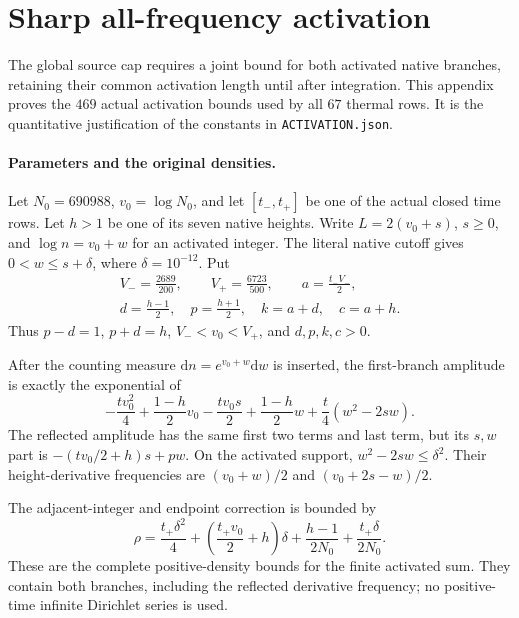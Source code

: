 \documentclass[11pt,a4paper]{article}
\theoremstyle{definition}
\theoremstyle{remark}
\newcommand{\dd}{\mathrm d}
\begin{document}






\clearpage\appendix
\section{Sharp all-frequency activation}\label{verification:sharp-activation}
The global source cap requires a joint bound for both activated native
branches, retaining their common activation length until after integration.
This appendix proves the $469$ actual activation bounds used by all $67$
thermal rows. It is the quantitative justification of the constants in
\texttt{ACTIVATION.json}.

\paragraph{Parameters and the original densities.}
Let $N_0=690988$, $v_0=\log N_0$, and let $[t_-,t_+]$ be one of the
actual closed time rows. Let $h>1$ be one of its seven native heights.
Write $L=2(v_0+s)$, $s\ge0$, and $\log n=v_0+w$ for an activated
integer. The literal native cutoff gives $0<w\le s+\delta$, where
$\delta=10^{-12}$. Put
\begin{gather*}
 V_-=\frac{2689}{200},\qquad V_+=\frac{6723}{500},\qquad
 a=\frac{t_-V_-}{2},\\
 d=\frac{h-1}{2},\quad p=\frac{h+1}{2},\quad k=a+d,\quad c=a+h.
\end{gather*}
Thus $p-d=1$, $p+d=h$, $V_-<v_0<V_+$, and $d,p,k,c>0$.

After the counting measure $\dd n=e^{v_0+w}\dd w$ is inserted, the
first-branch amplitude is exactly the exponential of
\[
 -\frac{t v_0^2}{4}+\frac{1-h}{2}v_0
 -\frac{t v_0s}{2}+\frac{1-h}{2}w
 +\frac t4(w^2-2sw).
\]
The reflected amplitude has the same first two terms and last term,
but its $s,w$ part is $-(t v_0/2+h)s+pw$. On the activated support,
$w^2-2sw\le\delta^2$. Their height-derivative frequencies are
$(v_0+w)/2$ and $(v_0+2s-w)/2$.

The adjacent-integer and endpoint correction is bounded by
\begin{equation}\label{eq:rho}
 \rho=\frac{t_+\delta^2}{4}
 +\left(\frac{t_+v_0}{2}+h\right)\delta
 +\frac{h-1}{2N_0}+\frac{t_+\delta}{2N_0}.
\end{equation}
These are the complete positive-density bounds for the finite activated
sum. They contain both branches, including the reflected derivative
frequency; no positive-time infinite Dirichlet series is used.
\end{document}
